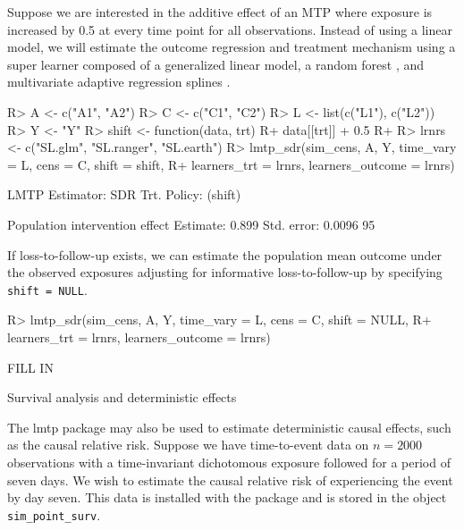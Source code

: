 \documentclass[twoside,11pt]{article}
\newenvironment{CodeChunk}{}{}
\newcommand{\pkg}[1]{{\fontseries{b}\selectfont #1}}
\let\code=\texttt
\begin{document}
Suppose we are interested in the additive effect of an MTP where exposure is increased by 0.5 at every time point for all observations. Instead of using a linear model,  we will estimate the outcome regression and treatment mechanism using a super learner composed of a generalized linear model, a random forest \citep{wrightRanger}, and multivariate adaptive regression splines \citep{milborrowEarth}. 

\begin{CodeChunk}
\begin{CodeInput}
R> A <- c("A1", "A2")
R> C <- c("C1", "C2")
R> L <- list(c("L1"), c("L2"))
R> Y <- "Y"
R> shift <- function(data, trt) {
R+   data[[trt]] + 0.5
R+ }
R> lrnrs <- c("SL.glm", "SL.ranger", "SL.earth")
R> lmtp_sdr(sim_cens, A, Y, time_vary = L, cens = C, shift = shift, 
R+          learners_trt = lrnrs, learners_outcome = lrnrs)
\end{CodeInput}

\begin{CodeOutput}
LMTP Estimator: SDR
   Trt. Policy: (shift)

Population intervention effect
      Estimate: 0.899
    Std. error: 0.0096
        95%
\end{CodeOutput}
\end{CodeChunk}

If loss-to-follow-up exists, we can estimate the population mean outcome under the observed exposures adjusting for informative loss-to-follow-up by specifying \code{shift = NULL}. 

\begin{CodeChunk}

\begin{CodeInput}
R> lmtp_sdr(sim_cens, A, Y, time_vary = L, cens = C, shift = NULL, 
R+          learners_trt = lrnrs, learners_outcome = lrnrs)
\end{CodeInput}

\begin{CodeOutput}
FILL IN
\end{CodeOutput}
\end{CodeChunk}

\hypertarget{example-3-survival-analysis-and-deterministic-effects}{
\begin{example}{Survival analysis and deterministic effects}
\end{example}}

The \pkg{lmtp} package may also be used to estimate deterministic causal effects, such as the causal relative risk. Suppose we have time-to-event data on \(n = 2000\) observations with a time-invariant dichotomous exposure followed for a period of seven days. We wish to estimate the causal relative risk of experiencing the event by day seven. This data is installed with the package and is stored in the object \code{sim\_point\_surv}. 
\end{document}

